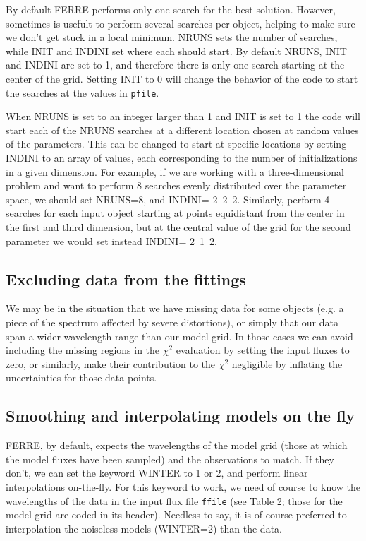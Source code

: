 \documentclass[12pt]{article}
\begin{document}
By default FERRE performs only one search for the best solution.
However, sometimes is usefult to perform several searches per object,
helping to make sure we don't get stuck in a local minimum.
NRUNS sets the number of searches, while INIT and INDINI set where each should
start. By default NRUNS, INIT and INDINI are set to 1, and therefore there is
only one search starting at the center of the grid.
Setting INIT to 0 will change the behavior of the code to start the searches
at the values in {\tt pfile}. 

When NRUNS is set to an integer larger than
1 and INIT is set to 1 the code will start each of the NRUNS searches at a 
different location chosen at random values of the parameters. This can be changed 
to start at specific locations by setting INDINI to an array of values, each
corresponding to the number of initializations in a given dimension. For example,
if we are working with a three-dimensional problem and want to perform 8 searches
evenly distributed over the parameter space, we should set NRUNS=8, and
INDINI= 2~2~2.  Similarly, perform 4 searches for each input object 
starting at points equidistant from the center in the first and third dimension,
but at the central value of the grid for the second parameter we would set instead
INDINI= 2~1~2.

\subsection{Excluding data from the fittings}

We may be in the situation that we have missing data for some objects
(e.g. a piece of the spectrum affected by severe distortions), or
simply that our data span a wider wavelength range than our model grid.
In those cases  we can avoid including the missing regions in the 
$\chi^2$ evaluation by setting the input fluxes to zero, or similarly, 
make their contribution to the $\chi^2$ negligible by inflating the uncertainties
for those data points.

\subsection{Smoothing and interpolating models on the fly}
\label{sinter}

FERRE, by default, expects the wavelengths of the model grid (those at which
the model fluxes have been sampled) and the observations to match. If they don't,
we can set the keyword WINTER to 1 or 2, and perform linear interpolations
on-the-fly. For this keyword to work, we need of course to know the wavelengths
of the data in the input flux file {\tt ffile} (see Table 2; those for the model
grid are coded in its header).
Needless to say, it is of course preferred to interpolation the noiseless 
models (WINTER=2) than the data.
\end{document}
